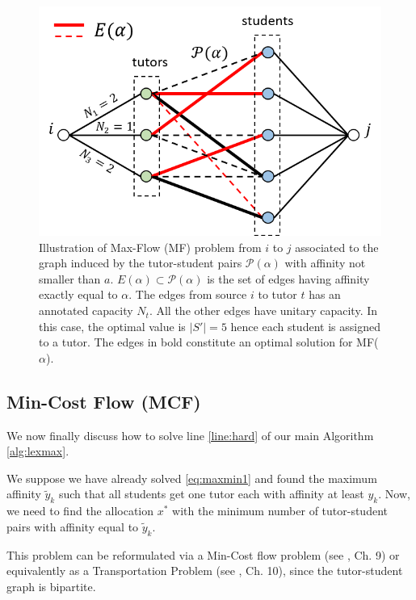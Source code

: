 \documentclass[11pt,oneside,a4paper]{article}     %
\begin{document}
\begin{figure}
\centering
\includegraphics[scale=.65]{figs/maxflow.png}
\caption{Illustration of Max-Flow (MF) problem from $i$ to $j$ associated to the graph induced by the tutor-student pairs $\mathcal P(\alpha)$ with affinity not smaller than $a$. $E(\alpha)\subset \mathcal P(\alpha)$ is the set of edges having affinity exactly equal to $\alpha$. The edges from source $i$ to tutor $t$ has an annotated capacity $N_t$. All the other edges have unitary capacity. In this case, the optimal value is $|S'|=5$ hence each student is assigned to a tutor. The edges in bold constitute an optimal solution for MF($\alpha$).}
\label{fig:MF}
\end{figure}




\subsection{Min-Cost Flow (MCF)} \label{sec:mcf}

We now finally discuss how to solve line \ref{line:hard} of our main Algorithm \ref{alg:lexmax}.

We suppose we have already solved \eqref{eq:maxmin1} and found the maximum affinity $\widetilde{y}_k$ such that all students get one tutor each with affinity at least $y_k$. Now, we need to find the allocation $x^*$ with the minimum number of tutor-student pairs with affinity equal to $\widetilde{y}_k$. 

This problem can be reformulated via a Min-Cost flow problem (see \cite{bazaraa2011linear}, Ch. 9) or equivalently as a Transportation Problem (see \cite{bazaraa2011linear}, Ch. 10), since the tutor-student graph is bipartite. 
\end{document}
